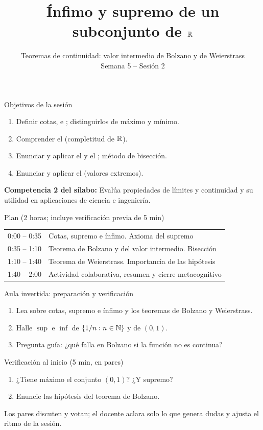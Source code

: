 \documentclass[10pt,aspectratio=169]{beamer}
\title[Supremo, Bolzano y Weierstrass]{Ínfimo y supremo de un subconjunto de $\mathbb{R}$}
\subtitle{Teoremas de continuidad: valor intermedio de Bolzano y de Weierstrass\\[2pt]\small Semana 5 -- Sesión 2}
\begin{document}
\begin{frame}
  \titlepage
\end{frame}

\begin{frame}{Objetivos de la sesión}
  \begin{enumerate}
    \item Definir cotas,  e ; distinguirlos de máximo y mínimo.
    \item Comprender el  (completitud de $\mathbb{R}$).
    \item Enunciar y aplicar el  y el ; método de bisección.
    \item Enunciar y aplicar el  (valores extremos).
  \end{enumerate}
  \vspace{1mm}
  {\small\textbf{Competencia 2 del sílabo:} Evalúa propiedades de límites y continuidad y su utilidad en aplicaciones de ciencia e ingeniería.}
  \begin{block}{Plan (2 horas; incluye verificación previa de 5 min)}
    \begin{tabular}{ll}
      0:00 -- 0:35 & Cotas, supremo e ínfimo. Axioma del supremo\\
      0:35 -- 1:10 & Teorema de Bolzano y del valor intermedio. Bisección\\
      1:10 -- 1:40 & Teorema de Weierstrass. Importancia de las hipótesis\\
      1:40 -- 2:00 & Actividad colaborativa, resumen y cierre metacognitivo
    \end{tabular}
  \end{block}
\end{frame}

\begin{frame}{Aula invertida: preparación y verificación}
  \small
  \begin{previa}
    \begin{enumerate}
      \item Lea sobre cotas, supremo e ínfimo y los teoremas de Bolzano y Weierstrass.
      \item Halle $\sup$ e $\inf$ de $\{1/n:n\in\mathbb{N}\}$ y de $(0,1)$.
      \item Pregunta guía: ¿qué falla en Bolzano si la función no es continua?
    \end{enumerate}
  \end{previa}
  \begin{block}{Verificación al inicio (5 min, en pares)}
    \begin{enumerate}
      \item ¿Tiene máximo el conjunto $(0,1)$? ¿Y supremo?
      \item Enuncie las hipótesis del teorema de Bolzano.
    \end{enumerate}
    Los pares discuten y votan; el docente aclara solo lo que genera dudas y ajusta el ritmo de la sesión.
  \end{block}
\end{frame}
\end{document}
